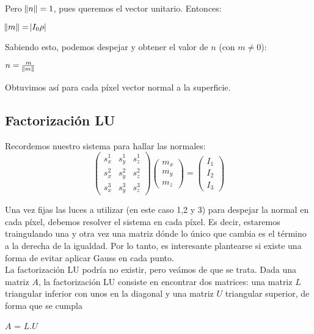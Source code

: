 Pero $\norm{n} = 1$, pues queremos el vector unitario. Entonces:

\begin{center}
$\norm{m} = \abs{I_0 \rho}$
\end{center}

Sabiendo esto, podemos despejar y obtener el valor de $n$ (con $m \neq 0$):

\begin{center}
$n = \frac{m}{\norm{m}}$
\end{center}

Obtuvimos así para cada píxel vector normal a la superficie.

\subsection{Factorización LU}

Recordemos nuestro sistema para hallar las normales:
\[
\begin{pmatrix}
    s_{x}^{1} & s_{y}^{1} & s_{z}^{1} \\
    s_{x}^{2} & s_{y}^{2} & s_{z}^{2} \\
    s_{x}^{3} & s_{y}^{3} & s_{z}^{3}
\end{pmatrix}
\begin{pmatrix}
    m_{x} \\
    m_{y} \\
    m_{z}
\end{pmatrix}
=
\begin{pmatrix}
    I_{1} \\
    I_{2} \\
    I_{3}
\end{pmatrix}
\]

Una vez fijas las luces a utilizar (en este caso 1,2 y 3) para despejar la normal en cada píxel, debemos resolver el sistema en cada píxel. Es decir, estaremos traingulando una y otra vez una matriz dónde lo único que cambia es el término a la derecha de la igualdad. Por lo tanto, es interesante plantearse si existe una forma de evitar aplicar Gauss en cada punto. \\

La factorización LU podría no existir, pero veámos de que se trata. Dada una matriz $A$, la factorización LU consiste en encontrar dos matrices: una matriz $L$ triangular inferior con unos en la diagonal y una matriz $U$ triangular superior, de forma que se cumpla

\begin{center}
$A$ = $L$.$U$
\end{center}

